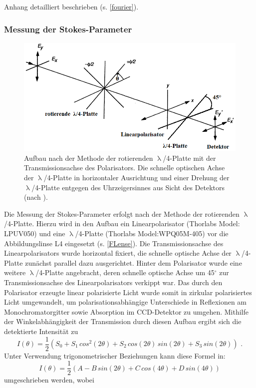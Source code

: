 Anhang detailliert beschrieben (s. \autoref{fourier}). \subsubsection{Messung
der Stokes-Parameter} \label{Mess.Stokes} \begin{figure}[h]
\includegraphics[width=.8\textwidth]{Bilder/Methodik/stokesaufbau}
\caption{Aufbau nach der Methode der rotierenden $\uplambda$/4-Platte mit der
Transmissionsachse des Polarisators. Die schnelle optischen Achse der
$\uplambda$/4-Platte in horizontaler Ausrichtung und einer Drehung der
$\uplambda$/4-Platte entgegen des Uhrzeigersinnes aus Sicht des Detektors (nach
\cite{Goldstein.2003}).} \end{figure} \noindent Die Messung der Stokes-Parameter
erfolgt nach der Methode der rotierenden $\uplambda$/4-Platte. Hierzu wird in
den Aufbau ein Linearpolarisator (Thorlabs Model: LPUV050) und eine
$\uplambda$/4-Platte (Thorlabs  Model:WPQ05M-405) vor die Abbildungslinse L4
eingesetzt (s. \autoref{FLense}). Die Transmissionsachse des Linearpolarisators
wurde horizontal fixiert, die schnelle optische Achse der $\uplambda$/4-Platte
zunächst parallel dazu ausgerichtet. Hinter dem Polarisator wurde eine weitere
$\uplambda$/4-Platte angebracht, deren schnelle optische Achse um 45$^\circ$ zur
Transmissionsachse des Linearpolarisators verkippt war. Das durch den
Polarisator erzeugte linear polarisierte Licht wurde somit in zirkular
polarisiertes Licht umgewandelt, um polarisationsabhängige Unterschiede in
Reflexionen am Monochromatorgitter sowie Absorption im CCD-Detektor zu umgehen.
Mithilfe der Winkelabhängigkeit der Transmission durch diesen Aufbau ergibt sich
die detektierte Intensität zu \begin{equation} I(\theta)= \frac{1}{2} \left( S_0
+ S_1 \, cos^2(2\theta) + S_2 \, cos(2\theta)\,sin(2\theta) + S_3 \,
sin(2\theta) \right) \text{ .} \label{StokesGleichung} \end{equation} Unter
Verwendung trigonometrischer Beziehungen kann diese Formel in: \begin{equation}
I(\theta)= \frac{1}{2}\left( A - B\, sin(2\theta) + C\, cos(4\theta) + D\,
sin(4\theta)\right) \label{StokesGl2} \end{equation} umgeschrieben werden, wobei
